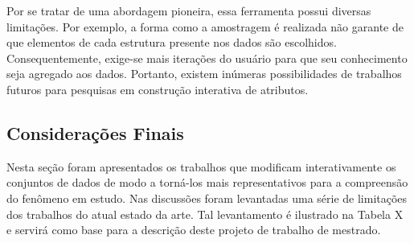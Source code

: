 Por se tratar de uma abordagem pioneira, essa ferramenta
possui diversas limitações. Por exemplo, a forma como a
amostragem é realizada não garante de que elementos de cada
estrutura presente nos dados são escolhidos.
Consequentemente, exige-se mais iterações do usuário 
para que seu conhecimento seja agregado aos dados. Portanto,
existem inúmeras possibilidades de trabalhos futuros para
pesquisas em construção interativa de atributos.

\subsection{Considerações Finais}

Nesta seção foram apresentados os trabalhos que modificam
interativamente os conjuntos de dados de modo a torná-los mais
representativos para a compreensão do fenômeno em estudo.
Nas discussões foram levantadas uma série de limitações
dos trabalhos do atual estado da arte. Tal levantamento é
ilustrado na Tabela X e servirá como base para a descrição
deste projeto de trabalho de mestrado.
